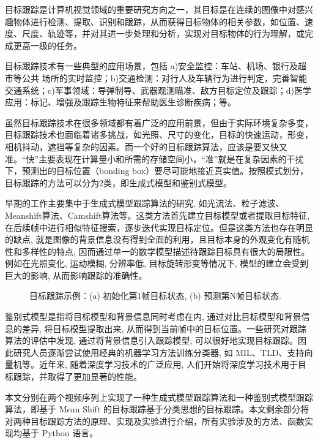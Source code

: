 
目标跟踪是计算机视觉领域的重要研究方向之一，其目标是在连续的图像中对感兴趣物体进行检测、提取、识别和跟踪，从而获得目标物体的相关参数，如位置、速度、尺度、轨迹等，并对其进一步处理和分析，实现对目标物体的行为理解，或完成更高一级的任务。

目标跟踪技术有一些典型的应用场景，包括 a)安全监控：车站、机场、银行及超市等公共 场所的实时监控；b)交通检测：对行人及车辆行为进行判定，完善智能交通系统；c)军事领域：导弹制导、武器观测瞄准、敌方目标定位及跟踪；d)医学应用：标记、增强及跟踪生物特征来帮助医生诊断疾病；等。

虽然目标跟踪技术在很多领域都有着广泛的应用前景，但由于实际环境复杂多变，目标跟踪技术也面临着诸多挑战，如光照、尺寸的变化，目标的快速运动，形变，相机抖动，遮挡等复杂的因素。而一个好的目标跟踪算法，应该是要又快又准。“快”主要表现在计算量小和所需的存储空间小，“准”就是在复杂因素的干扰下，预测出的目标位置（bonding box）要尽可能地接近真实值。按照模式划分，目标跟踪的方法可以分为2类，即生成式模型和鉴别式模型。

 早期的工作主要集中于生成式模型跟踪算法的研究, 如光流法、粒子滤波、Meanshift算法、Camshift算法等。这类方法首先建立目标模型或者提取目标特征, 在后续帧中进行相似特征搜索，逐步迭代实现目标定位。但是这类方法也存在明显的缺点, 就是图像的背景信息没有得到全面的利用，且目标本身的外观变化有随机性和多样性的特点, 因而通过单一的数学模型描述待跟踪目标具有很大的局限性。例如在光照变化, 运动模糊, 分辨率低, 目标旋转形变等情况下, 模型的建立会受到巨大的影响, 从而影响跟踪的准确性。

\begin{figure}[!ht]
  \centering
  \begin{minipage}[b]{\linewidth} 
  \end{minipage}
  \vfill
  \caption{目标跟踪示例：(a) 初始化第1帧目标状态, (b) 预测第N帧目标状态.}
  \label{fig:tracker_example}
\end{figure}

鉴别式模型是指将目标模型和背景信息同时考虑在内, 通过对比目标模型和背景信息的差异, 将目标模型提取出来, 从而得到当前帧中的目标位置。一些研究对跟踪算法的评估中发现, 通过将背景信息引入跟踪模型, 可以很好地实现目标跟踪。因此研究人员逐渐尝试使用经典的机器学习方法训练分类器, 如 MIL、TLD、支持向量机等。近年来, 随着深度学习技术的广泛应用, 人们开始将深度学习技术用于目标跟踪，并取得了更加显著的性能。

本文分别在两个视频序列上实现了一种生成式模型跟踪算法和一种鉴别式模型跟踪算法，即基于 Mean Shift 的目标跟踪基于分类思想的目标跟踪。本文剩余部分将对两种目标跟踪方法的原理、实现及实验进行介绍，所有实验涉及的方法、函数实现均基于 Python 语言。